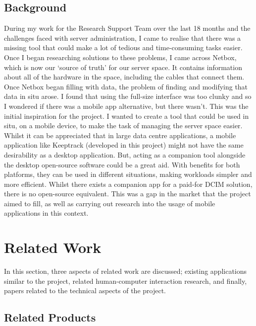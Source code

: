 \documentclass [11pt,a4paper]{article}
\begin{document}
\subsection{Background}
\label{sec:background}
During my work for the Research Support Team over the last 18 months and the challenges faced with server administration, I came to realise that there was a missing tool that could make a lot of tedious and time-consuming tasks easier. Once I began researching solutions to these problems, I came across Netbox, which is now our `source of truth' for our server space. It contains information about all of the hardware in the space, including the cables that connect them. Once Netbox began filling with data, the problem of finding and modifying that data in situ arose. I found that using the full-size interface was too clunky and so I wondered if there was a mobile app alternative, but there wasn't. This was the initial inspiration for the project. I wanted to create a tool that could be used in situ, on a mobile device, to make the task of managing the server space easier. Whilst it can be appreciated that in large data centre applications, a mobile application like Keeptrack (developed in this project) might not have the same desirability as a desktop application. But, acting as a companion tool alongside the desktop open-source software could be a great aid. With benefits for both platforms, they can be used in different situations, making workloads simpler and more efficient. Whilst there exists a companion app for a paid-for DCIM solution, there is no open-source equivalent. This was a gap in the market that the project aimed to fill, as well as carrying out research into the usage of mobile applications in this context.

\pagebreak

\section{Related Work}

In this section, three aspects of related work are discussed; existing applications similar to the project, related human-computer interaction research, and finally, papers related to the technical aspects of the project.

\subsection{Related Products}
\label{sec:app_reviews}
\end{document}
